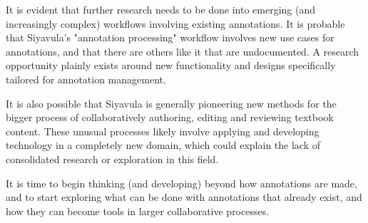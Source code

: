 It is evident that further research needs to be done into emerging (and increasingly complex) workflows involving existing annotations. It is probable that Siyavula's "annotation processing" workflow involves new use cases for annotations, and that there are others like it that are undocumented. A research opportunity plainly exists around new functionality and designs specifically tailored for annotation management. 

It is also possible that Siyavula is generally pioneering new methods for the bigger process of collaboratively authoring, editing and reviewing textbook content. These unusual processes likely involve applying and developing technology in a completely new domain, which could explain the lack of consolidated research or exploration in this field.

It is time to begin thinking (and developing) beyond how annotations are made, and to start exploring what can be done with annotations that already exist, and how they can become tools in larger collaborative processes.
